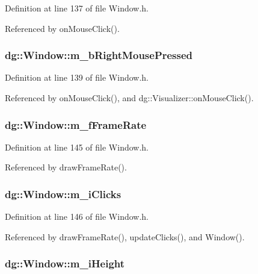 Definition at line 137 of file Window.h.

Referenced by on\-Mouse\-Click().
\subsubsection{ dg::Window::m\_\-b\-Right\-Mouse\-Pressed\hspace{0.3cm}{\tt  [protected]}}\label{classdg_1_1Window_n2}




Definition at line 139 of file Window.h.

Referenced by on\-Mouse\-Click(), and dg::Visualizer::on\-Mouse\-Click().
\subsubsection{ dg::Window::m\_\-f\-Frame\-Rate\hspace{0.3cm}{\tt  [protected]}}\label{classdg_1_1Window_n6}




Definition at line 145 of file Window.h.

Referenced by draw\-Frame\-Rate().
\subsubsection{ dg::Window::m\_\-i\-Clicks\hspace{0.3cm}{\tt  [protected]}}\label{classdg_1_1Window_n7}




Definition at line 146 of file Window.h.

Referenced by draw\-Frame\-Rate(), update\-Clicks(), and Window().
\subsubsection{ dg::Window::m\_\-i\-Height\hspace{0.3cm}{\tt  [protected]}}\label{classdg_1_1Window_n15}





